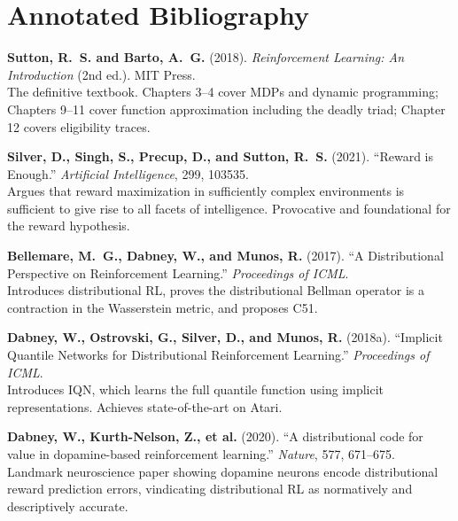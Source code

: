 \documentclass[11pt,a4paper]{article}
\begin{document}
\section{Annotated Bibliography}
\label{sec:bib}

\begin{enumerate}[label={[\arabic*]}, leftmargin=*, itemsep=6pt]

\item \textbf{Sutton, R.~S. and Barto, A.~G.} (2018).
  \textit{Reinforcement Learning: An Introduction} (2nd ed.). MIT Press. \\
  The definitive textbook. Chapters 3--4 cover MDPs and dynamic programming;
  Chapters 9--11 cover function approximation including the deadly triad;
  Chapter 12 covers eligibility traces.

\item \textbf{Silver, D., Singh, S., Precup, D., and Sutton, R.~S.} (2021).
  ``Reward is Enough.'' \textit{Artificial Intelligence}, 299, 103535. \\
  Argues that reward maximization in sufficiently complex environments is
  sufficient to give rise to all facets of intelligence. Provocative and
  foundational for the reward hypothesis.

\item \textbf{Bellemare, M.~G., Dabney, W., and Munos, R.} (2017).
  ``A Distributional Perspective on Reinforcement Learning.''
  \textit{Proceedings of ICML}. \\
  Introduces distributional RL, proves the distributional Bellman operator
  is a contraction in the Wasserstein metric, and proposes C51.

\item \textbf{Dabney, W., Ostrovski, G., Silver, D., and Munos, R.} (2018a).
  ``Implicit Quantile Networks for Distributional Reinforcement Learning.''
  \textit{Proceedings of ICML}. \\
  Introduces IQN, which learns the full quantile function using implicit
  representations. Achieves state-of-the-art on Atari.

\item \textbf{Dabney, W., Kurth-Nelson, Z., et al.} (2020).
  ``A distributional code for value in dopamine-based reinforcement learning.''
  \textit{Nature}, 577, 671--675. \\
  Landmark neuroscience paper showing dopamine neurons encode distributional
  reward prediction errors, vindicating distributional RL as normatively
  and descriptively accurate.


\end{enumerate}
\end{document}
